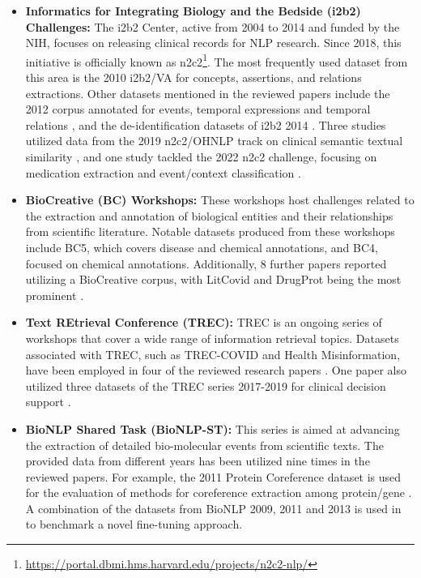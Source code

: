 \documentclass[fleqn,10pt]{olplainarticle}
\begin{document}
\begin{itemize}
    \item \textbf{Informatics for Integrating Biology and the Bedside (i2b2) Challenges:}  The i2b2 Center, active from 2004 to 2014 and funded by the NIH, focuses on releasing clinical records for NLP research. Since 2018, this initiative is officially known as n2c2\footnote{\url{https://portal.dbmi.hms.harvard.edu/projects/n2c2-nlp/}}. The most frequently used dataset from this area is the 2010 i2b2/VA for concepts, assertions, and relations extractions. Other datasets mentioned in the reviewed papers include the 2012 corpus annotated for events, temporal expressions and temporal relations \citep{chen2019general}, and the de-identification datasets of i2b2 2014 \citep{tang2019identification}. Three studies utilized data from the 2019 n2c2/OHNLP track on clinical semantic textual similarity \citep{mahajan2020identification,wang2021knowledge,xiong2023eara}, and one study tackled the 2022 n2c2 challenge, focusing on medication extraction and event/context classification \citep{chen2023contextualized}.

    \item \textbf{BioCreative (BC) Workshops:} These workshops host challenges related to the extraction and annotation of biological entities and their relationships from scientific literature. Notable datasets produced from these workshops include BC5, which covers disease and chemical annotations, and BC4, focused on chemical annotations. Additionally, 8 further papers reported utilizing a BioCreative corpus, with LitCovid and DrugProt being the most prominent \citep{lin2022bert,rabby2023multi,asada2023integrating,aldahdooh2023mining}.

    \item \textbf{Text REtrieval Conference (TREC):} TREC is an ongoing series of workshops that cover a wide range of information retrieval topics. Datasets associated with TREC, such as TREC-COVID and Health Misinformation, have been employed in four of the reviewed research papers \citep{sarrouti2021evidence,almeida2020frugal,tahri2023transitioning,otegi2020automatic}. One paper also utilized three datasets of the TREC series 2017-2019  for clinical decision support \citep{zhang2023hybrid}.

    \item \textbf{BioNLP Shared Task (BioNLP-ST):} This series is aimed at advancing the extraction of detailed bio-molecular events from scientific texts. The provided data from different years has been utilized nine times in the reviewed papers. For example, the 2011 Protein Coreference dataset is used for the evaluation of methods for coreference extraction among protein/gene \citep{li2022distinguished}.
    A combination of the datasets from BioNLP 2009, 2011 and 2013 is used in \cite{zeng2020tri} to benchmark a novel fine-tuning approach. 

\end{itemize}
\end{document}
